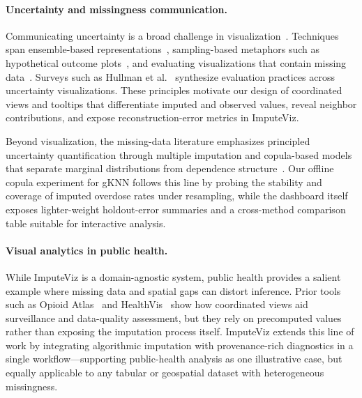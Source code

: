 \documentclass{egpubl}
\begin{document}
\paragraph*{Uncertainty and missingness communication.}
Communicating uncertainty is a broad challenge in visualization~\cite{hullman2019authors}. Techniques span ensemble-based representations~\cite{potter2009ensemble}, sampling-based metaphors such as hypothetical outcome plots~\cite{Kale2019HOPsTrends}, and evaluating visualizations that contain missing data~\cite{song2018s}. Surveys such as Hullman et al.~\cite{hullman2018pursuit} synthesize evaluation practices across uncertainty visualizations. These principles motivate our design of coordinated views and tooltips that differentiate imputed and observed values, reveal neighbor contributions, and expose reconstruction-error metrics in ImputeViz. 

Beyond visualization, the missing-data literature emphasizes principled uncertainty quantification through multiple imputation and copula-based models that separate marginal distributions from dependence structure~\cite{nelsen2006introduction,joe2014dependence,hollenbach2021multiple}. Our offline copula experiment for gKNN follows this line by probing the stability and coverage of imputed overdose rates under resampling, while the dashboard itself exposes lighter-weight holdout-error summaries and a cross-method comparison table suitable for interactive analysis.


\paragraph*{Visual analytics in public health.}
While ImputeViz is a domain-agnostic system, public health provides a salient example where missing data and spatial gaps can distort inference. Prior tools such as Opioid Atlas~\cite{sankaran2016opioid} and HealthVis~\cite{Carroll2014HealthVis} show how coordinated views aid surveillance and data-quality assessment, but they rely on precomputed values rather than exposing the imputation process itself. ImputeViz extends this line of work by integrating algorithmic imputation with provenance-rich diagnostics in a single workflow—supporting public-health analysis as one illustrative case, but equally applicable to any tabular or geospatial dataset with heterogeneous missingness.
\end{document}
